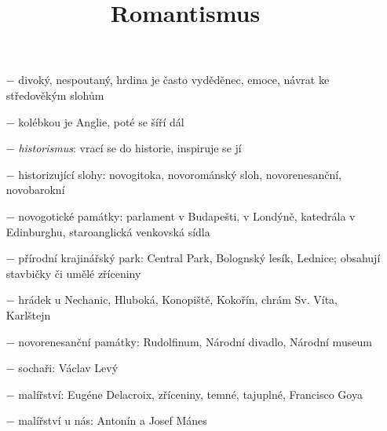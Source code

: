 \documentclass{article}
\title{\vspace{-2cm}Romantismus\vspace{-1.7cm}}
\date{}
\author{}
\begin{document}
\maketitle

\begin{itemize}
    \vspace{-0.5em}
    \setlength\itemsep{0.15em}
    \item[$-$] divoký, nespoutaný, hrdina je často vyděděnec, emoce, návrat ke středověkým slohům
    \item[$-$] kolébkou je Anglie, poté se šíří dál
    \item[$-$] \textit{historismus}: vrací se do historie, inspiruje se jí
    \item[$-$] historizující slohy: novogitoka, novorománský sloh, novorenesanční, novobarokní
    \item[$-$] novogotické památky: parlament v Budapešti, v Londýně, katedrála v Edinburghu, staroanglická venkovská sídla
    \item[$-$] přírodní krajinářský park: Central Park, Bolognský lesík, Lednice; obsahují stavbičky či umělé zříceniny
    \item[$-$] hrádek u Nechanic, Hluboká, Konopiště, Kokořín, chrám Sv. Víta, Karlštejn
    \item[$-$] novorenesanční památky: Rudolfinum, Národní divadlo, Národní museum
    \item[$-$] sochaři: Václav Levý
    \item[$-$] malířství: Eugéne Delacroix, zříceniny, temné, tajuplné, Francisco Goya
    \item[$-$] malířství u nás: Antonín a Josef Mánes
\end{itemize}
\end{document}
